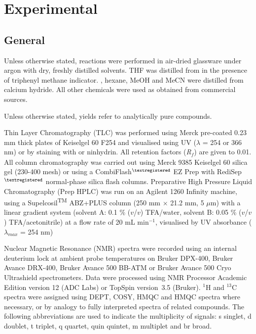 \newpage

\section{Experimental}

\subsection{General}

Unless otherwise stated, reactions were performed in air-dried glassware under argon with dry, freshly distilled solvents. THF was distilled from  in the presence of triphenyl methane indicator. , hexane, MeOH and MeCN were distilled from calcium hydride. All other chemicals were used as obtained from commercial sources.

Unless otherwise stated, yields refer to analytically pure compounds. 

Thin Layer Chromatography (TLC) was performed using Merck pre-coated 0.23 mm thick plates of Keiselgel 60 F254 and visualised using UV ($\lambda$ = 254 or 366 nm) or by staining with  or ninhydrin. 
All retention factors (\textit{R}$_\textit{f}$) are given to 0.01. 
All column chromatography was carried out using Merck 9385 Keiselgel 60 silica gel (230-400 mesh) or using a CombiFlash$^{\tiny{\textregistered}}$ EZ Prep with RediSep$^{\tiny{\textregistered}}$ normal-phase silica flash columns. 
Preparative High Pressure Liquid Chromatography (Prep HPLC) was run on an Agilent 1260 Infinity machine, using a Supelcosil\textsuperscript{TM} ABZ+PLUS column (250 mm $\times$ 21.2 mm, 5 $\mu$m) with a linear gradient system (solvent A: 0.1 \% ($v$/$v$) TFA/water, solvent B: 0.05 \% ($v$/$v$) TFA/acetonitrile) at a flow rate of 20 mL min$^{-1}$, visualised by UV absorbance ($\lambda_{max}$ = 254 nm)

Nuclear Magnetic Resonance (NMR) spectra were recorded using an internal deuterium lock at ambient probe temperatures on Bruker DPX-400, Bruker Avance DRX-400, Bruker Avance 500 BB-ATM or Bruker Avance 500 Cryo Ultrashield spectrometers. Data were processed using NMR Processor Academic Edition version 12 (ADC Labs) or TopSpin version 3.5 (Bruker). $^1$H and $^13$C spectra were assigned using DEPT, COSY, HMQC and HMQC spectra where necessary, or by analogy to fully interpreted spectra of related compounds. The following abbreviations are used to indicate the multiplicity of signals: s singlet, d doublet, t triplet, q quartet, quin quintet, m multiplet and br broad.

